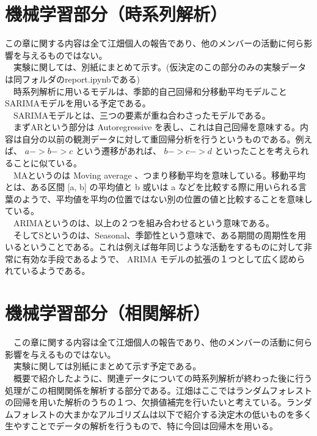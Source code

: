 \documentclass{scrartcl}
\begin{document}
\section{機械学習部分（時系列解析）}
\label{sec:org5f136a4}
  この章に関する内容は全て江畑個人の報告であり、他のメンバーの活動に何ら影響を与えるものではない。\\
　実験に関しては、別紙にまとめて示す。(仮決定のこの部分のみの実験データは同フォルダのreport.ipynbである)\\
　時系列解析に用いるモデルは、季節的自己回帰和分移動平均モデルことSARIMAモデルを用いる予定である。\\
　SARIMAモデルとは、三つの要素が重ね合わさったモデルである。\\
　まずARという部分は Autoregressive を表し、これは自己回帰を意味する。内容は自分の以前の観測データに対して重回帰分析を行うというものである。例えば、 \(a->b->c\) という遷移があれば、 \(b->c->d\) といったことを考えられることに似ている。\\
　MAというのは Moving average 、つまり移動平均を意味している。移動平均とは、ある区間 [a, b] の平均値と b 或いは a などを比較する際に用いられる言葉のようで、平均値を平均の位置ではない別の位置の値と比較することを意味している。\\
　ARIMAというのは、以上の２つを組み合わせるという意味である。\\
　そしてSというのは、Seasonal、季節性という意味で、ある期間の周期性を用いるということである。これは例えば毎年同じような活動をするものに対して非常に有効な手段であるようで、 ARIMA モデルの拡張の１つとして広く認められているようである。\\

\section{機械学習部分（相関解析）}
\label{sec:org5c5dcc0}
　この章に関する内容は全て江畑個人の報告であり、他のメンバーの活動に何ら影響を与えるものではない。\\
　実験に関しては別紙にまとめて示す予定である。\\
　概要で紹介したように、関連データについての時系列解析が終わった後に行う処理がこの相関関係を解析する部分である。江畑はここではランダムフォレストの回帰を用いた解析のうちの１つ、欠損値補完を行いたいと考えている。ランダムフォレストの大まかなアルゴリズムは以下で紹介する決定木の低いものを多く生やすことでデータの解析を行うもので、特に今回は回帰木を用いる。\\
\end{document}
